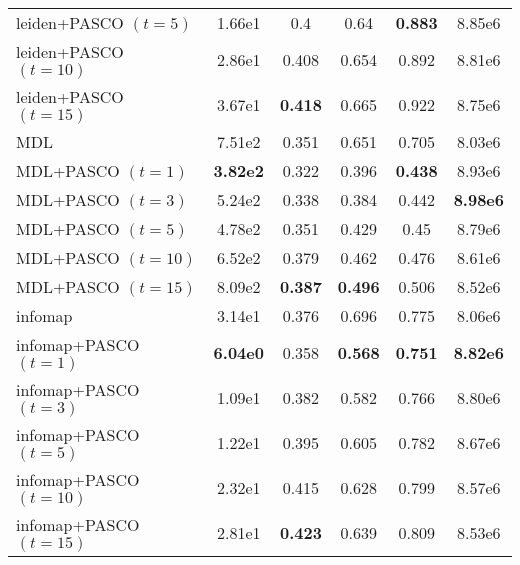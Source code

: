 \begin{tabular}{lccccc}
leiden+PASCO $(t=5)$ & 1.66e1 &  0.4 & 0.64 & \textbf{0.883} & 8.85e6 \\
leiden+PASCO $(t=10)$ & 2.86e1 & 0.408 & 0.654 & 0.892 & 8.81e6 \\
leiden+PASCO $(t=15)$ & 3.67e1 & \textbf{0.418} & 0.665 & 0.922 & 8.75e6 \\
\midrule
MDL & 7.51e2 & 0.351 & 0.651 & 0.705 & 8.03e6 \\
MDL+PASCO $(t=1)$ & \textbf{3.82e2} & 0.322 & 0.396 & \textbf{0.438} & 8.93e6 \\
MDL+PASCO $(t=3)$ & 5.24e2 & 0.338 & 0.384 & 0.442 & \textbf{8.98e6} \\
MDL+PASCO $(t=5)$ & 4.78e2 & 0.351 & 0.429 & 0.45 & 8.79e6 \\
MDL+PASCO $(t=10)$ & 6.52e2 & 0.379 & 0.462 & 0.476 & 8.61e6 \\
MDL+PASCO $(t=15)$ & 8.09e2 & \textbf{0.387} & \textbf{0.496} & 0.506 & 8.52e6 \\
\midrule
infomap & 3.14e1 & 0.376 & 0.696 & 0.775 & 8.06e6 \\
infomap+PASCO $(t=1)$ & \textbf{6.04e0} & 0.358 & \textbf{0.568} & \textbf{0.751} & \textbf{8.82e6} \\
infomap+PASCO $(t=3)$ & 1.09e1 & 0.382 & 0.582 & 0.766 & 8.80e6 \\
infomap+PASCO $(t=5)$ & 1.22e1 & 0.395 & 0.605 & 0.782 & 8.67e6 \\
infomap+PASCO $(t=10)$ & 2.32e1 & 0.415 & 0.628 & 0.799 & 8.57e6 \\
infomap+PASCO $(t=15)$ & 2.81e1 & \textbf{0.423} & 0.639 & 0.809 & 8.53e6 \\
\bottomrule
\end{tabular}